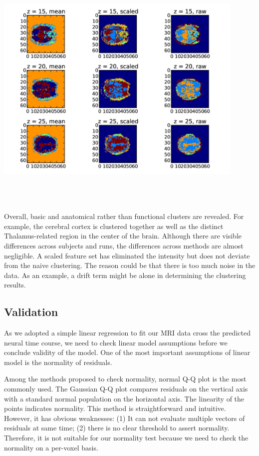 \documentclass[11pt]{article}
\begin{document}
\centering
\includegraphics[width=12cm, height=12cm]{subject_across_methods.jpg}

Overall, basic and anatomical rather than functional clusters are revealed. For
example, the cerebral cortex is clustered together as well as the distinct
Thalamus-related region in the center of the brain.  Although there are visible
differences across subjects and runs, the differences across methods are almost
negligible. A scaled feature set has eliminated the intensity but does not
deviate from the naive clustering. The reason could be that there is too much
noise in the data. As an example, a drift term might be alone in determining the
clustering results. 

\subsection{Validation}

As we adopted a simple linear regression to fit our MRI data cross the predicted
neural time course, we need to check linear model assumptions before we conclude
validity of the model. One of the most important assumptions of linear model is
the normality of residuals.

Among the methods proposed to check normality, normal Q-Q plot is the most
commonly used. The Gaussian Q-Q plot compares residuals on the vertical axis
with a standard normal population on the horizontal axis. The linearity of the
points indicates normality. This method is straightforward and
intuitive. However, it has obvious weaknesses: (1) It can not evaluate multiple
vectors of residuals at same time; (2) there is no clear threshold to assert
normality. Therefore, it is not suitable for our normality test because we need
to check the normality on a per-voxel basis.
\end{document}
